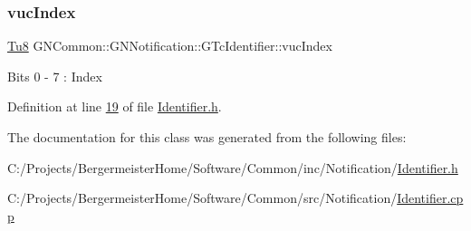 \mbox{\label{class_g_n_common_1_1_g_n_notification_1_1_g_tc_identifier_a16810ad9a26866f6c408e59745b55b8e}} 
\subsubsection{\texorpdfstring{vuc\+Index}{vucIndex}}
{\footnotesize\ttfamily \mbox{\hyperlink{namespace_g_n_common_a7939e251ddbf5d3a31832dcfdc8bde39}{Tu8}} G\+N\+Common\+::\+G\+N\+Notification\+::\+G\+Tc\+Identifier\+::vuc\+Index}

Bits 0 -\/ 7 \+: Index 

Definition at line \mbox{\hyperlink{_identifier_8h_source_l00019}{19}} of file \mbox{\hyperlink{_identifier_8h_source}{Identifier.\+h}}.



The documentation for this class was generated from the following files\+:\begin{DoxyCompactItemize}
\item 
C\+:/\+Projects/\+Bergermeister\+Home/\+Software/\+Common/inc/\+Notification/\mbox{\hyperlink{_identifier_8h}{Identifier.\+h}}\item 
C\+:/\+Projects/\+Bergermeister\+Home/\+Software/\+Common/src/\+Notification/\mbox{\hyperlink{_identifier_8cpp}{Identifier.\+cpp}}\end{DoxyCompactItemize}

